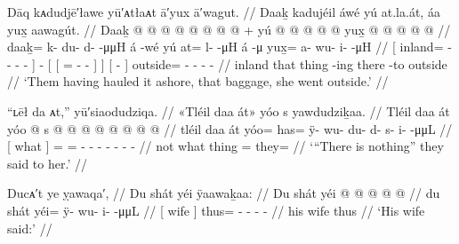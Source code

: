 \ex\label{ex:89-81-haul-go-outside}%
%
\begingl
	\glpreamble	Dāq kᴀdudjē′ławe yū′ᴀtłaᴀt ā′yux ā′wagut. //
	\glpreamble	Daaḵ kadujéil áwé yú at.la.át, áa yux̱ aawagút. //
	\gla	{} Daaḵ @  @ {} @ {} @ {} @ {} @ {} @ {} {}
		 @ {} +
		{} yú {}  @ {} @ {} @ {} @ {} {} {}
		{}  @ {} {}
		yux̱ @  @ {} @ {} @ {} @ {} //
	\glb	{} daaḵ= k- {} du- d-  -μμH {} {}
		á -wé
		{} yú {} at= l-  -μH {} {} {}
		{} á -μ {}
		yux̱= a- wu- i-  -μH //
	\glc	{}[ inland= - \· - -  - \· {}]
		 -
		{}[  {}[ = -  - \· {}] {}]
		{}[  - {}]
		outside= - - -  - //
	\gld	{} inland  {} {} {} {} {} {} {}
		 {}
		{} that {} thing\·  {} {} -ing {} {}
		{} there -to {}
		outside  {} {} {} {} //
	\glft	‘Them having hauled it ashore, that baggage, she went outside.’
		//
\endgl
\xe

\ex\label{ex:89-82-there-is-nothing-said}%
%
\begingl
	\glpreamble	“ʟēł da ᴀt,” yū′siaodudziqa. //
	\glpreamble	«\!Tléil daa át\!» yóo s yawdudziḵaa. //
	\gla	{} Tléil daa át {}
		yóo @ s @  @ {} @ {} @ {} @ {} @ {} @ {} @ {} //
	\glb	{} tléil daa át {}
		yóo= has= ÿ- wu- du- d- s- i-  -μμL //
	\glc	{}[  what  {}]
		= = - - - - - -  - //
	\gld	{} not what thing {}
		= they=  {} {} {} {} {} {} {} //
	\glft	‘“There is nothing” they said to her.’
		//
\endgl
\xe

\ex\label{ex:89-83-his-wife-said}%
%
\begingl
	\glpreamble	Ducᴀ′t ye ỵawaqa′, //
	\glpreamble	Du shát yéi ÿaawaḵaa: //
	\gla	{} Du shát {} yéi @  @ {} @ {} @ {} @ {} //
	\glb	{} du shát {} yéi= ÿ- wu- i-  -μμL //
	\glc	{}[  wife {}] thus= - - -  - //
	\gld	{} his wife {} thus  {} {} {} {} //
	\glft	‘His wife said:’
		//
\endgl
\xe


